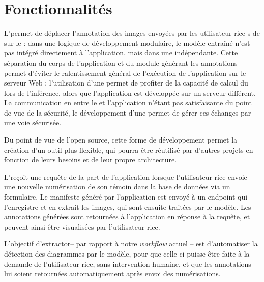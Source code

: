 \section{Fonctionnalités}
L’\api permet de déplacer l’annotation des images envoyées par les utilisateur-rice-s de \eida sur le \gpu : dans une logique de développement modulaire, le modèle entraîné n’est pas intégré directement à l’application, mais dans une \api indépendante. Cette séparation du corps de l’application et du module générant les annotations permet d’éviter le ralentissement général de l’exécution de l’application sur le serveur Web : l’utilisation d’une \api permet de profiter de la capacité de calcul du \gpu lors de l’inférence, alors que l’application est développée sur un serveur différent. La communication en \ssh entre le \gpu et l’application \eida n’étant pas satisfaisante du point de vue de la sécurité, le développement d’une \api permet de gérer ces échanges par une voie sécurisée.

Du point de vue de l’open source, cette forme de développement permet la création d’un outil plus flexible, qui pourra être réutilisé par d’autres projets en fonction de leurs besoins et de leur propre architecture.

L’\api reçoit une requête \http de la part de l’application \eida lorsque l’utilisateur-rice envoie une nouvelle numérisation de son témoin dans la base de données via un formulaire. Le manifeste généré par l’application est envoyé à un \api endpoint qui l’enregistre et en extrait les images, qui sont ensuite traitées par le modèle. Les annotations générées sont retournées à l’application en réponse à la requête, et peuvent ainsi être visualisées par l’utilisateur-rice.

L’objectif d’extractor\api – par rapport à notre \textit{workflow} actuel – est d’automatiser la détection des diagrammes par le modèle, pour que celle-ci puisse être faite à la demande de l’utilisateur-rice, sans intervention humaine, et que les annotations lui soient retournées automatiquement après envoi des numérisations.

